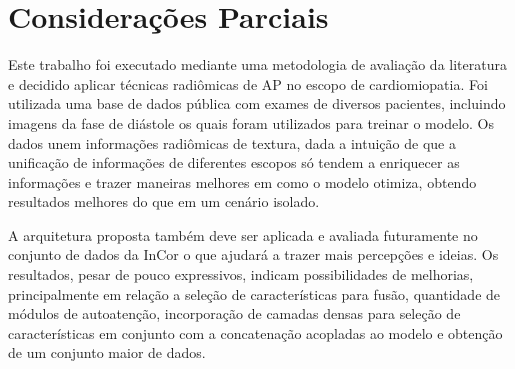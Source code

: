 \chapter{Considerações Parciais}
\label{chap:consideracoes_parciais}

Este trabalho foi executado mediante uma metodologia de avaliação da literatura e decidido aplicar técnicas radiômicas de \gls{AP} no escopo de cardiomiopatia. Foi utilizada uma base de dados pública com exames de diversos pacientes, incluindo imagens da fase de diástole os quais foram utilizados para treinar o modelo. Os dados unem informações radiômicas de textura, dada a intuição de que a unificação de informações de diferentes escopos só tendem a enriquecer as informações e trazer maneiras melhores em como o modelo otimiza, obtendo resultados melhores do que em um cenário isolado.

A arquitetura proposta também deve ser aplicada e avaliada futuramente no conjunto de dados da \gls{InCor} o que ajudará a trazer mais percepções e ideias. Os resultados, pesar de pouco expressivos, indicam possibilidades de melhorias, principalmente em relação a seleção de características para fusão, quantidade de módulos de autoatenção, incorporação de camadas densas para seleção de características em conjunto com a concatenação acopladas ao modelo e obtenção de um conjunto maior de dados. 